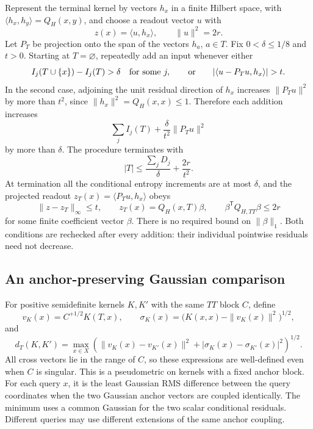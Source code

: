 Represent the terminal kernel by vectors $h_x$ in a finite Hilbert
space, with $\langle h_x,h_y\rangle=Q_H(x,y)$, and choose a readout
vector $u$ with
\[
 z(x)=\langle u,h_x\rangle,\qquad \|u\|^2=2r.
\]
Let $P_T$ be projection onto the span of the vectors $h_a$, $a\in T$.
Fix $0<\delta\le1/8$ and $t>0$. Starting at $T=\varnothing$,
repeatedly add an input whenever either
\[
 I_j(T\cup\{x\})-I_j(T)>\delta
 \quad\hbox{for some }j,
 \qquad\hbox{or}\qquad
 |\langle u-P_Tu,h_x\rangle|>t.
\]
In the second case, adjoining the unit residual direction of $h_x$
increases $\|P_Tu\|^2$ by more than $t^2$, since
$\|h_x\|^2=Q_H(x,x)\le1$. Therefore each addition increases
\[
 \sum_j I_j(T)+\frac{\delta}{t^2}\|P_Tu\|^2
\]
by more than $\delta$. The procedure terminates with
\begin{equation}\label{eq:critical-anchor-count}
 |T|\le\frac{\sum_jD_j}{\delta}+\frac{2r}{t^2}.
\end{equation}
At termination all the conditional entropy increments are at most
$\delta$, and the projected readout
$z_T(x)=\langle P_Tu,h_x\rangle$ obeys
\begin{equation}\label{eq:critical-anchor-readout}
 \|z-z_T\|_\infty\le t,
 \qquad z_T(x)=Q_H(x,T)\beta,
 \qquad \beta^{\mathsf T}Q_{H,TT}\beta\le2r
\end{equation}
for some finite coefficient vector $\beta$. There is no required
bound on $\|\beta\|_1$. Both conditions are rechecked after every
addition: their individual pointwise residuals need not decrease.

\subsection{An anchor-preserving Gaussian comparison}

For positive semidefinite kernels $K,K'$ with the same $TT$ block
$C$, define
\[
 v_K(x)=C^{+1/2}K(T,x),\qquad
 \sigma_K(x)=\bigl(K(x,x)-\|v_K(x)\|^2\bigr)^{1/2},
\]
and
\[
 d_T(K,K')=\max_{x\in X}
 \left(\|v_K(x)-v_{K'}(x)\|^2
             +|\sigma_K(x)-\sigma_{K'}(x)|^2\right)^{1/2}.
\]
All cross vectors lie in the range of $C$, so these expressions are
well-defined even when $C$ is singular. This is a pseudometric on
kernels with a fixed anchor block. For each query $x$, it is the
least Gaussian RMS difference between the query coordinates when
the two Gaussian anchor vectors are coupled identically. The minimum
uses a common Gaussian for the two scalar conditional residuals.
Different queries may use different extensions of the same anchor
coupling.

